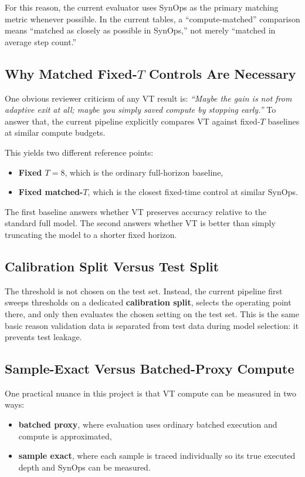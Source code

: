 \documentclass[11pt]{article}
\begin{document}
For this reason, the current evaluator uses SynOps as the primary matching metric whenever possible. In the current tables, a ``compute-matched'' comparison means ``matched as closely as possible in SynOps,'' not merely ``matched in average step count.''

\subsection{Why Matched Fixed-$T$ Controls Are Necessary}
One obvious reviewer criticism of any VT result is: \emph{``Maybe the gain is not from adaptive exit at all; maybe you simply saved compute by stopping early.''} To answer that, the current pipeline explicitly compares VT against fixed-$T$ baselines at similar compute budgets.

This yields two different reference points:
\begin{itemize}[leftmargin=1.5em]
    \item \textbf{Fixed $T=8$}, which is the ordinary full-horizon baseline,
    \item \textbf{Fixed matched-$T$}, which is the closest fixed-time control at similar SynOps.
\end{itemize}

The first baseline answers whether VT preserves accuracy relative to the standard full model. The second answers whether VT is better than simply truncating the model to a shorter fixed horizon.

\subsection{Calibration Split Versus Test Split}
The threshold is not chosen on the test set. Instead, the current pipeline first sweeps thresholds on a dedicated \textbf{calibration split}, selects the operating point there, and only then evaluates the chosen setting on the test set. This is the same basic reason validation data is separated from test data during model selection: it prevents test leakage.

\subsection{Sample-Exact Versus Batched-Proxy Compute}
One practical nuance in this project is that VT compute can be measured in two ways:
\begin{itemize}[leftmargin=1.5em]
    \item \textbf{batched proxy}, where evaluation uses ordinary batched execution and compute is approximated,
    \item \textbf{sample exact}, where each sample is traced individually so its true executed depth and SynOps can be measured.
\end{itemize}
\end{document}
